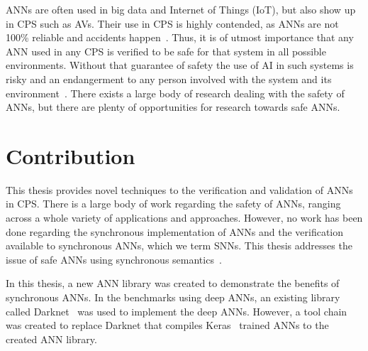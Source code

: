 \acp{ANN} are often used in big data and Internet of Things (IoT), but also show up in \ac{CPS} such as \acfp{AV}.
Their use in \ac{CPS} is highly contended, as \acp{ANN} are not 100\% reliable and accidents happen~\cite{coldewey_2018}.
Thus, it is of utmost importance that any \ac{ANN} used in any \ac{CPS} is verified to be safe for that system in all possible environments.
Without that guarantee of safety the use of \ac{AI} in such systems is risky and an endangerment to any person involved with the system and its environment~\cite{ANNSafety2018}.
There exists a large body of research dealing with the safety of \acp{ANN}, but there are plenty of opportunities for research towards safe \acp{ANN}.

\section{Contribution}
This thesis provides novel techniques to the verification and validation of \acfp{ANN} in \acf{CPS}.
There is a large body of work regarding the safety of \acp{ANN}, ranging across a whole variety of applications and approaches.
However, no work has been done regarding the synchronous implementation of \acp{ANN} and the verification available to synchronous \acp{ANN}, which we term \acfp{SNN}.  
This thesis addresses the issue of safe \acp{ANN} using synchronous semantics~\cite{berry1991}.

In this thesis, a new \ac{ANN} library was created to demonstrate the benefits of synchronous \acp{ANN}.
In the benchmarks using deep \acp{ANN}, an existing library called Darknet~\cite{darknet13} was used to implement the deep \acp{ANN}.
However, a tool chain was created to replace Darknet that compiles Keras~\cite{chollet2015keras} trained \acp{ANN} to the created \ac{ANN} library.

